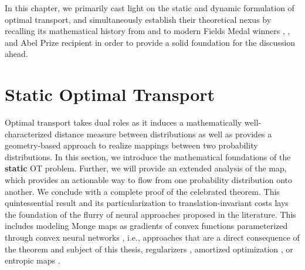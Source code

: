 In this chapter, we primarily cast light on the static and dynamic formulation of optimal transport, and simultaneously establish their theoretical nexus by recalling its mathematical history from \citet{monge1781histoire} and \citet{kantorovich1942transfer} to modern Fields Medal winners \citet{villani2009optimal}, \citeauthor{figalli2010optimal}, and Abel Prize recipient \citet{caffarelli1990interior} in order to provide a solid foundation for the discussion ahead.


\section{Static Optimal Transport} \label{sec:background_ot_static}

 Optimal transport takes dual roles as it induces a mathematically well-characterized distance measure between distributions as well as provides a geometry-based approach to realize mappings between two probability distributions.
In this section, we introduce the mathematical foundations of the \textbf{static} OT problem. Further, we will provide an extended analysis of the \citeauthor{monge1781histoire} map, which provides an actionable way to flow from one probability distribution onto another.
We conclude with a complete proof of the celebrated \citeauthor{brenier1987decomposition} theorem. This quintessential result and its particularization to translation-invariant costs lays the foundation of the flurry of neural approaches proposed in the literature. This includes modeling Monge maps as gradients of convex functions parameterized through convex neural networks \citep{amos2017input, huang2021convex, makkuva2020optimal, korotin2021neural, lubeck2022neural, bunne2022supervised}, i.e., approaches that are a direct consequence of the \citeauthor{brenier1987decomposition} theorem and subject of this thesis, regularizers \citep{uscidda2023monge}, amortized optimization \citep{amos2022amortizing, amos2022meta}, or entropic maps \citep{pooladian2021entropic, pooladian2023minimax, divol2022optimal, cuturi2023monge}.


